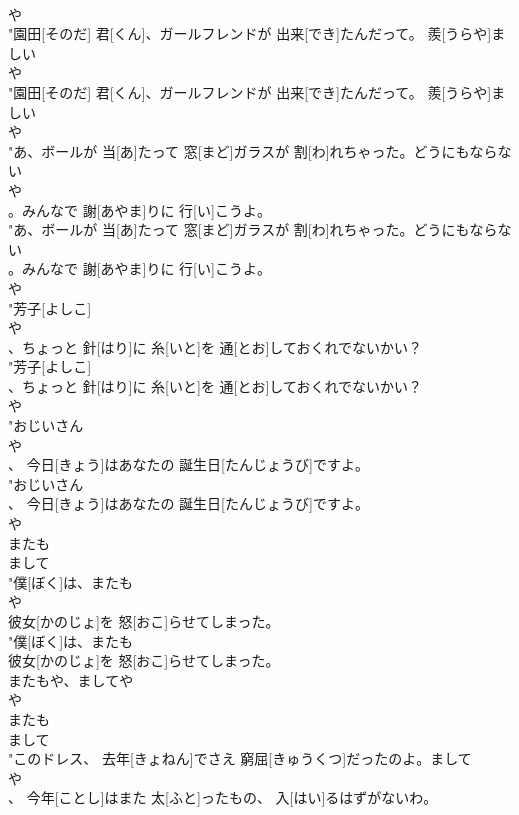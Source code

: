 \documentclass[8pt]{extreport}
\begin{document}
\begin{CJK}{UTF8}{min}
\\	や
\\	"園田[そのだ] 君[くん]、ガールフレンドが 出来[でき]たんだって。 羨[うらや]ましい
\\	や
\\	"園田[そのだ] 君[くん]、ガールフレンドが 出来[でき]たんだって。 羨[うらや]ましい
\\	や
\\	"あ、ボールが 当[あ]たって 窓[まど]ガラスが 割[わ]れちゃった。どうにもならない
\\	や
\\	。みんなで 謝[あやま]りに 行[い]こうよ。
\\	"あ、ボールが 当[あ]たって 窓[まど]ガラスが 割[わ]れちゃった。どうにもならない
\\	。みんなで 謝[あやま]りに 行[い]こうよ。
\\	や
\\	"芳子[よしこ]
\\	や
\\	、ちょっと 針[はり]に 糸[いと]を 通[とお]しておくれでないかい？
\\	"芳子[よしこ]
\\	、ちょっと 針[はり]に 糸[いと]を 通[とお]しておくれでないかい？
\\	や
\\	"おじいさん
\\	や
\\	、 今日[きょう]はあなたの 誕生日[たんじょうび]ですよ。
\\	"おじいさん
\\	、 今日[きょう]はあなたの 誕生日[たんじょうび]ですよ。
\\	や
\\	またも
\\	まして
\\	"僕[ぼく]は、またも
\\	や
\\	彼女[かのじょ]を 怒[おこ]らせてしまった。
\\	"僕[ぼく]は、またも
\\	彼女[かのじょ]を 怒[おこ]らせてしまった。
\\	またもや、ましてや	
\\	や
\\	またも
\\	まして
\\	"このドレス、 去年[きょねん]でさえ 窮屈[きゅうくつ]だったのよ。まして
\\	や
\\	、 今年[ことし]はまた 太[ふと]ったもの、 入[はい]るはずがないわ。

\end{CJK}
\end{document}
